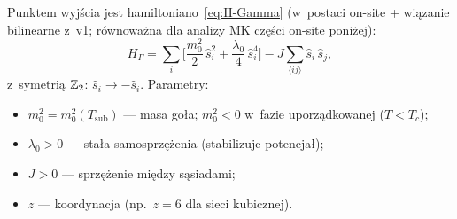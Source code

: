 Punktem wyj\'scia jest hamiltoniano~\eqref{eq:H-Gamma}
(w~posta\-ci on-site + wi\k{a}zanie bilinearne z~v1; r\'ownowa\.zna
dla analizy MK cz\k{e}\'sci on-site poni\.zej):
\begin{equation}\label{eq:B-H}
  H_\Gamma = \sum_i \biggl[
    \frac{m_0^2}{2}\,\hat{s}_i^2
    + \frac{\lambda_0}{4}\,\hat{s}_i^4
  \biggr]
  - J\sum_{\langle ij\rangle} \hat{s}_i\,\hat{s}_j,
\end{equation}
z~symetri\k{a} $\mathbb{Z}_2$: $\hat{s}_i \to -\hat{s}_i$.
Parametry:
\begin{itemize}[nosep]
  \item $m_0^2 = m_0^2(T_{\mathrm{sub}})$ --- masa go\l{}a;
    $m_0^2 < 0$ w~fazie uporz\k{a}dkowanej ($T < T_c$);
  \item $\lambda_0 > 0$ --- sta\l{}a samosprz\k{e}\.zenia
    (stabilizuje potencja\l{});
  \item $J > 0$ --- sprz\k{e}\.zenie mi\k{e}dzy s\k{a}siadami;
  \item $z$ --- koordynacja (np.\ $z = 6$ dla sieci kubicznej).
\end{itemize}

